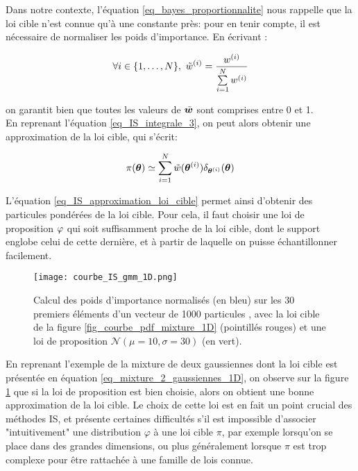  Dans notre contexte, l'équation \eqref{eq_bayes_proportionnalite} nous rappelle que la loi cible n'est connue qu'à une constante près: pour en tenir compte, il est nécessaire de normaliser les poids d'importance. En écrivant : 
 
 \begin{equation}
	 \forall i \in \{1, \dots, N\}, ~ {\tilde{w}}^{(i)} = \dfrac{w^{(i)}}{\sum\limits_{i=1}^N w^{(i)}}
	 \label{eq_IS_poids_normalises}
 \end{equation}

 on garantit bien que toutes les valeurs de ${\tilde{\bm{w}}}$ sont comprises entre 0 et 1. \\
 
 En reprenant l'équation \eqref{eq_IS_integrale_3}, on peut alors obtenir une approximation de la loi cible, qui s'écrit:
 
 \begin{equation}
	 \pi({\bm{\theta}}) \simeq \sum\limits_{i=1}^N {\tilde{w}}({\bm{\theta}}^{(i)})\delta_{{\bm{\theta}}^{(i)}}({\bm{\theta}})
	 \label{eq_IS_approximation_loi_cible}
 \end{equation}

L'équation \eqref{eq_IS_approximation_loi_cible} permet ainsi d'obtenir des particules pondérées de la loi cible. Pour cela, il faut choisir une loi de proposition ${\varphi}$ qui soit suffisamment proche de la loi cible, dont le support englobe celui de cette dernière, et à partir de laquelle on puisse échantillonner facilement. \\

\begin{figure}[h!]
	\centering
	\texttt{[image: courbe\_IS\_gmm\_1D.png]}
	\caption{Calcul des poids d'importance normalisés  (en bleu) sur les 30 premiers éléments d'un vecteur de 1000 particules , avec la loi cible de la figure \ref{fig_courbe_pdf_mixture_1D} (pointillés rouges) et une loi de proposition $\mathcal{N}(\mu = 10, \sigma = 30)$ (en vert).  }
	\label{fig_IS_gmm_1D}
\end{figure}

\newpage En reprenant l'exemple de la mixture de deux gaussiennes {dont la loi cible est présentée en équation \eqref{eq_mixture_2_gaussiennes_1D}}, on observe sur la figure \ref{fig_IS_gmm_1D} que si la loi de proposition est bien choisie, alors on obtient une bonne approximation de la loi cible. Le choix de cette loi est en fait un point crucial des méthodes IS, et présente certaines difficultés s'il est impossible d'associer "intuitivement" une distribution $\varphi$ à une loi cible $\pi$, par exemple lorsqu'on se place dans des grandes dimensions, ou plus généralement lorsque $\pi$ est trop complexe pour être rattachée à une famille de lois connue. 

